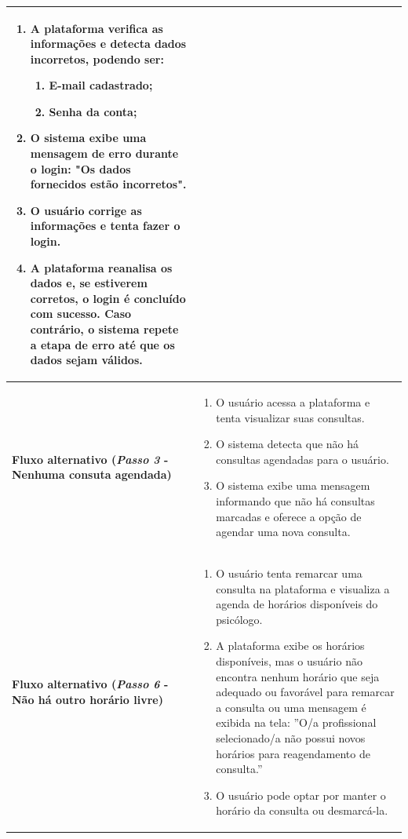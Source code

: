 \documentclass[a4paper,12pt]{report}
\begin{document}
\begin{longtable}{|p{4cm}|p{11.5cm}|}
\begin{enumerate}[leftmargin=*,labelsep=1em]
        \item A plataforma verifica as informações e detecta dados incorretos, podendo ser:
        \begin{enumerate}
            \item E-mail cadastrado;
            \item Senha da conta;
        \end{enumerate}
        \item O sistema exibe uma mensagem de erro durante o login: "Os dados fornecidos estão incorretos".
        \item O usuário corrige as informações e tenta fazer o login.
        \item A plataforma reanalisa os dados e, se estiverem corretos, o login é concluído com sucesso. Caso contrário, o sistema repete a etapa de erro até que os dados sejam válidos.
    \end{enumerate}\\ \hline
    \textbf{Fluxo alternativo (\textit{Passo 3} - Nenhuma consuta agendada)} & 
    \begin{enumerate}[leftmargin=*,labelsep=1em]
        \item O usuário acessa a plataforma e tenta visualizar suas consultas.
        \item O sistema detecta que não há consultas agendadas para o usuário.
        \item O sistema exibe uma mensagem informando que não há consultas marcadas e oferece a opção de agendar uma nova consulta.
    \end{enumerate} \\ \hline
    \textbf{Fluxo alternativo (\textit{Passo 6} - Não há outro horário livre)} & 
    \begin{enumerate}[leftmargin=*,labelsep=1em]
        \item O usuário tenta remarcar uma consulta na plataforma e visualiza a agenda de horários disponíveis do psicólogo.
        \item A plataforma exibe os horários disponíveis, mas o usuário não encontra nenhum horário que seja adequado ou favorável para remarcar a consulta ou uma mensagem é exibida na tela: ”O/a profissional selecionado/a não possui novos horários para reagendamento de
consulta.”
        \item O usuário pode optar por manter o horário da consulta ou desmarcá-la.
    \end{enumerate} \\ \hline
\end{longtable}
\end{document}
